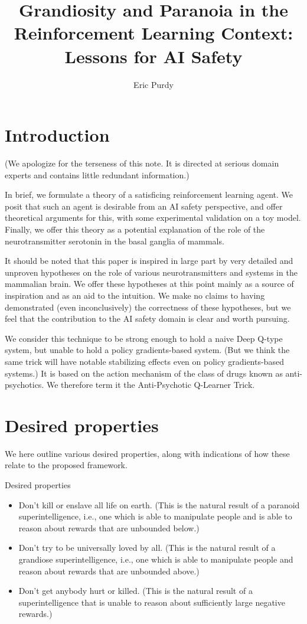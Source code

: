 \documentclass{article}
\title{Grandiosity and Paranoia in the Reinforcement Learning Context: Lessons
  for AI Safety}
\author{Eric Purdy}
\begin{document}
\maketitle

\section{Introduction}

(We apologize for the terseness of this note. It is directed at serious domain
experts and contains little redundant information.)

In brief, we formulate a theory of a satisficing reinforcement learning
agent. We posit that such an agent is desirable from an AI safety perspective,
and offer theoretical arguments for this, with some experimental validation on
a toy model. Finally, we offer this theory as a potential explanation of the
role of the neurotransmitter serotonin in the basal ganglia of mammals.

It should be noted that this paper is inspired in large part by very detailed
and unproven hypotheses on the role of various neurotransmitters and systems in
the mammalian brain. We offer these hypotheses at this point mainly as a source
of inspiration and as an aid to the intuition. We make no claims to having
demonstrated (even inconclusively) the correctness of these hypotheses, but we
feel that the contribution to the AI safety domain is clear and worth pursuing.

We consider this technique to be strong enough to hold a naive Deep Q-type
system, but unable to hold a policy gradients-based system. (But we think the
same trick will have notable stabilizing effects even on policy gradients-based
systems.) It is based on the action mechanism of the class of drugs known as
anti-psychotics. We therefore term it the Anti-Psychotic Q-Learner Trick.


\section{Desired properties}

We here outline various desired properties, along with indications of how these
relate to the proposed framework.

Desired properties
\begin{itemize}
\item Don't kill or enslave all life on earth. (This is the natural result of a
  paranoid superintelligence, i.e., one which is able to manipulate people and
  is able to reason about rewards that are unbounded below.)
\item Don't try to be universally loved by all. (This is the natural result of
  a grandiose superintelligence, i.e., one which is able to manipulate people
  and reason about rewards that are unbounded above.)
\item Don't get anybody hurt or killed. (This is the natural result of a
  superintelligence that is unable to reason about sufficiently large negative
  rewards.)
\end{itemize}
\end{document}
